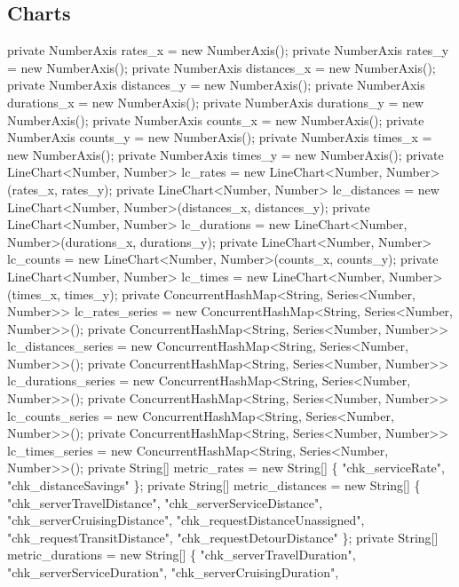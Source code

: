 \subsection{Charts}
\nwenddocs{}\plusendmoddef
private NumberAxis rates_x = new NumberAxis();
private NumberAxis rates_y = new NumberAxis();
private NumberAxis distances_x = new NumberAxis();
private NumberAxis distances_y = new NumberAxis();
private NumberAxis durations_x = new NumberAxis();
private NumberAxis durations_y = new NumberAxis();
private NumberAxis counts_x = new NumberAxis();
private NumberAxis counts_y = new NumberAxis();
private NumberAxis times_x = new NumberAxis();
private NumberAxis times_y = new NumberAxis();
private LineChart<Number, Number> lc_rates = new LineChart<Number, Number>(rates_x, rates_y);
private LineChart<Number, Number> lc_distances = new LineChart<Number, Number>(distances_x, distances_y);
private LineChart<Number, Number> lc_durations = new LineChart<Number, Number>(durations_x, durations_y);
private LineChart<Number, Number> lc_counts = new LineChart<Number, Number>(counts_x, counts_y);
private LineChart<Number, Number> lc_times = new LineChart<Number, Number>(times_x, times_y);
private ConcurrentHashMap<String, Series<Number, Number>> lc_rates_series =
    new ConcurrentHashMap<String, Series<Number, Number>>();
private ConcurrentHashMap<String, Series<Number, Number>> lc_distances_series =
    new ConcurrentHashMap<String, Series<Number, Number>>();
private ConcurrentHashMap<String, Series<Number, Number>> lc_durations_series =
    new ConcurrentHashMap<String, Series<Number, Number>>();
private ConcurrentHashMap<String, Series<Number, Number>> lc_counts_series =
    new ConcurrentHashMap<String, Series<Number, Number>>();
private ConcurrentHashMap<String, Series<Number, Number>> lc_times_series =
    new ConcurrentHashMap<String, Series<Number, Number>>();
private String[] metric_rates = new String[] \{
      "chk_serviceRate",
      "chk_distanceSavings"
    \};
private String[] metric_distances = new String[] \{
      "chk_serverTravelDistance",
      "chk_serverServiceDistance",
      "chk_serverCruisingDistance",
      "chk_requestDistanceUnassigned",
      "chk_requestTransitDistance",
      "chk_requestDetourDistance"
    \};
private String[] metric_durations = new String[] \{
      "chk_serverTravelDuration",
      "chk_serverServiceDuration",
      "chk_serverCruisingDuration",
